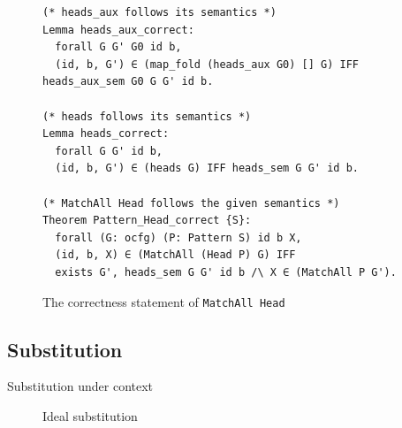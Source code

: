 \documentclass{beamer}
\newcommand{\inlinecoq}[1]{\mbox{\lstinline[style=customcoq,columns=fixed,basewidth=.48em]{#1}}}
\newcommand{\ilc}[1]{\inlinecoq{#1}}
\begin{document}
\begin{frame}
  \begin{figure}
    \begin{lstlisting}[style=customcoq,basicstyle=\small\ttfamily]
(* heads_aux follows its semantics *)
Lemma heads_aux_correct:
  forall G G' G0 id b,
  (id, b, G') ∈ (map_fold (heads_aux G0) [] G) IFF heads_aux_sem G0 G G' id b.

(* heads follows its semantics *)
Lemma heads_correct:
  forall G G' id b,
  (id, b, G') ∈ (heads G) IFF heads_sem G G' id b.

(* MatchAll Head follows the given semantics *)
Theorem Pattern_Head_correct {S}:
  forall (G: ocfg) (P: Pattern S) id b X,
  (id, b, X) ∈ (MatchAll (Head P) G) IFF
  exists G', heads_sem G G' id b /\ X ∈ (MatchAll P G').
      \end{lstlisting}
    \caption{The correctness statement of \ilc{MatchAll Head}}
    \label{fig:head_cor}
  \end{figure}
\end{frame}

\subsection*{Substitution}

\begin{frame}[noframenumbering]{Substitution under context}
  \begin{figure}
    \caption{Ideal substitution}
  \end{figure}
\end{frame}
\end{document}
